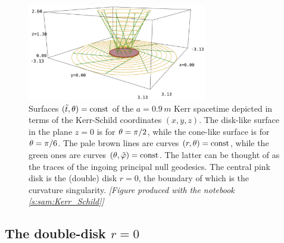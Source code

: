 \begin{figure}
\centerline{\includegraphics[width=0.7\textwidth]{ksm_theta_cut.jpg}}
\caption[]{\label{f:ksm:theta_cut} \footnotesize
Surfaces $({\tilde t},\theta)=\mathrm{const}$ of
the $a=0.9\, m$ Kerr spacetime depicted in terms of
the Kerr-Schild coordinates $(x,y,z)$.
The disk-like surface in the plane $z=0$ is for $\theta=\pi/2$, while
the cone-like surface is for $\theta=\pi/6$.
The pale brown lines are curves $(r,\theta)=\mathrm{const}$,
while the green ones are curves $(\theta,{\tilde\varphi})=\mathrm{const}$. The latter
can be thought of as the traces of the ingoing principal null geodesics.
The central pink disk is the (double) disk $r=0$, the boundary of which is the
curvature singularity.
\textsl{[Figure produced with the notebook \ref{s:sam:Kerr_Schild}]}
}
\end{figure}



\subsection{The double-disk $r=0$} \label{s:ksm:r_zero}

